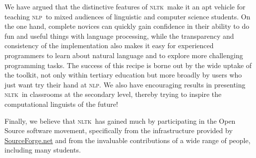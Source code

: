 \documentclass[11pt]{article}
\newcommand{\NLP}{\textsc{nlp}}
\newcommand{\NLTK}{\textsc{nltk}}
\begin{document}
We have argued that the distinctive features of \NLTK\ make it an apt
vehicle for teaching \NLP\ to mixed audiences of linguistic and
computer science students. On the one hand, complete novices can
quickly gain confidence in their ability to do fun and useful things
with language processing, while the transparency and consistency of
the implementation also makes it easy for experienced programmers to
learn about natural language and to explore more challenging
programming tasks. The success of this recipe is borne out by the wide
uptake of the toolkit, not only within tertiary education but more
broadly by users who just want try their hand at \NLP. We also have
encouraging results in presenting \NLTK\ in classrooms at the
secondary level, thereby trying to inspire the computational linguists of the
future!

Finally, we believe that \NLTK\ has gained much by participating 
in the Open Source software movement, specifically from
the infrastructure provided by
\url{SourceForge.net} and from the
invaluable contributions of a wide range of people, including many
students.

% 

\clearpage


\end{document}
